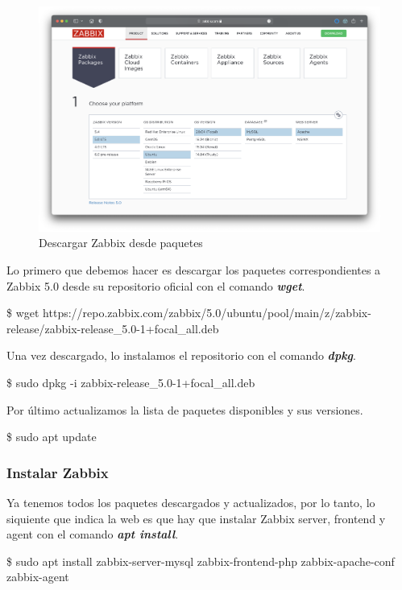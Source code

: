     \begin{figure}[H]
        \centering
        \includegraphics[scale=0.3]{images/zabbix_official.png}
        \caption{Descargar Zabbix desde paquetes}
        \label{fig:zabbix_official}
    \end{figure}

    Lo primero que debemos hacer es descargar los paquetes correspondientes a Zabbix 5.0 desde su repositorio oficial con el comando \textbf{\emph{wget}}. 
        \begin{tcolorbox}[colback=black!10, halign=left]
            \$ wget https://repo.zabbix.com/zabbix/5.0/ubuntu/pool/main/z/zabbix-release/zabbix-release\_5.0-1+focal\_all.deb
        \end{tcolorbox}

    Una vez descargado, lo instalamos el repositorio con el comando \textbf{\emph{dpkg}}.
        \begin{tcolorbox}[colback=black!10, halign=left]
            \$ sudo dpkg -i zabbix-release\_5.0-1+focal\_all.deb
        \end{tcolorbox}

    Por último actualizamos la lista de paquetes disponibles y sus versiones.
        \begin{tcolorbox}[colback=black!10, halign=left]
            \$ sudo apt update
        \end{tcolorbox}

    \newpage
    \subsubsection{Instalar Zabbix}

    Ya tenemos todos los paquetes descargados y actualizados, por lo tanto, lo siquiente que indica la web es que hay que instalar Zabbix server, frontend
    y agent con el comando \textbf{\emph{apt install}}.
        \begin{tcolorbox}[colback=black!10, halign=left]
            \$ sudo apt install zabbix-server-mysql zabbix-frontend-php zabbix-apache-conf zabbix-agent
        \end{tcolorbox}
    
